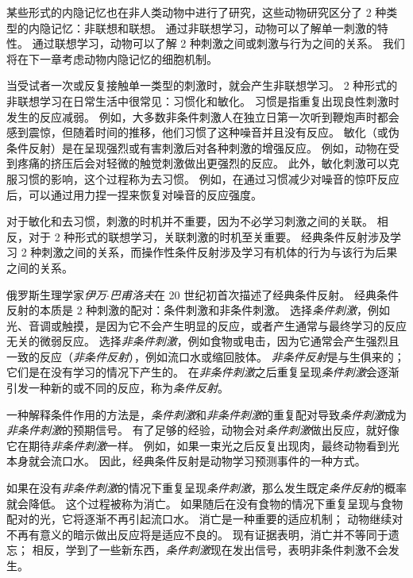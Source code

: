 某些形式的内隐记忆也在非人类动物中进行了研究，这些动物研究区分了 2 种类型的内隐记忆：非联想和联想。
通过非联想学习，动物可以了解单一刺激的特性。
通过联想学习，动物可以了解 2 种刺激之间或刺激与行为之间的关系。
我们将在下一章考虑动物内隐记忆的细胞机制。


当受试者一次或反复接触单一类型的刺激时，就会产生非联想学习。
2 种形式的非联想学习在日常生活中很常见：习惯化和敏化。
习惯是指重复出现良性刺激时发生的反应减弱。
例如，大多数非条件刺激人在独立日第一次听到鞭炮声时都会感到震惊，但随着时间的推移，他们习惯了这种噪音并且没有反应。
敏化（或伪条件反射）是在呈现强烈或有害刺激后对各种刺激的增强反应。
例如，动物在受到疼痛的挤压后会对轻微的触觉刺激做出更强烈的反应。
此外，敏化刺激可以克服习惯的影响，这个过程称为去习惯。
例如，在通过习惯减少对噪音的惊吓反应后，可以通过用力捏一捏来恢复对噪音的反应强度。


对于敏化和去习惯，刺激的时机并不重要，因为不必学习刺激之间的关联。
相反，对于 2 种形式的联想学习，关联刺激的时机至关重要。
经典条件反射涉及学习 2 种刺激之间的关系，而操作性条件反射涉及学习有机体的行为与该行为后果之间的关系。


俄罗斯生理学家\textit{伊万$\cdot$巴甫洛夫}在 20 世纪初首次描述了经典条件反射。
经典条件反射的本质是 2 种刺激的配对：条件刺激和非条件刺激。
选择\textit{条件刺激}，例如光、音调或触摸，是因为它不会产生明显的反应，或者产生通常与最终学习的反应无关的微弱反应。
选择\textit{非条件刺激}，例如食物或电击，因为它通常会产生强烈且一致的反应（\textit{非条件反射}），例如流口水或缩回肢体。
\textit{非条件反射}是与生俱来的；
它们是在没有学习的情况下产生的。
在\textit{非条件刺激}之后重复呈现\textit{条件刺激}会逐渐引发一种新的或不同的反应，称为\textit{条件反射}。


一种解释条件作用的方法是，\textit{条件刺激}和\textit{非条件刺激}的重复配对导致\textit{条件刺激}成为\textit{非条件刺激}的预期信号。
有了足够的经验，动物会对\textit{条件刺激}做出反应，就好像它在期待\textit{非条件刺激}一样。
例如，如果一束光之后反复出现肉，最终动物看到光本身就会流口水。
因此，经典条件反射是动物学习预测事件的一种方式。


如果在没有\textit{非条件刺激}的情况下重复呈现\textit{条件刺激}，那么发生既定\textit{条件反射}的概率就会降低。
这个过程被称为消亡。
如果随后在没有食物的情况下重复呈现与食物配对的光，它将逐渐不再引起流口水。
消亡是一种重要的适应机制；
动物继续对不再有意义的暗示做出反应将是适应不良的。
现有证据表明，消亡并不等同于遗忘；
相反，学到了一些新东西，\textit{条件刺激}现在发出信号，表明非条件刺激不会发生。



